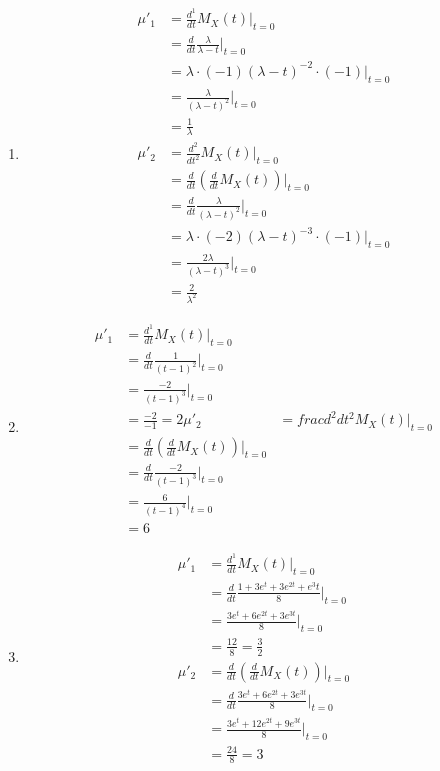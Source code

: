 \documentclass{article}
\begin{document}
\begin{enumerate}[label= zu \roman*)]
    \item 
        \begin{align*}
            \mu'_1 &= \frac{d^1}{dt} M_X(t) \bigg|_{t=0} \\
            &= \frac{d}{dt} \frac{\lambda}{\lambda - t} \bigg|_{t=0} \\  
            &= \lambda \cdot (-1)(\lambda - t)^{-2}\cdot(-1) \bigg|_{t=0} \\
            &= \frac{\lambda}{(\lambda - t)^2} \bigg|_{t=0} \\
            &= \frac{1}{\lambda} \\
            \mu'_2 &= \frac{d^2}{dt^2} M_X(t) \bigg|_{t=0} \\
            &= \frac{d}{dt} (\frac{d}{dt} M_X(t)) \bigg|_{t=0} \tag*{1. Ableitung von vorher} \\
            &= \frac{d}{dt} \frac{\lambda}{(\lambda - t)^2} \bigg|_{t=0} \\
            &= \lambda \cdot (-2) (\lambda- t)^{-3} \cdot (-1) \bigg|_{t=0}\\
            &= \frac{2\lambda}{(\lambda - t)^3} \bigg|_{t=0} \\
            &= \frac{2}{\lambda^2}
        \end{align*}
    \item 
        \begin{align*}
            \mu'_1 &= \frac{d^1}{dt} M_X(t) \bigg|_{t=0} \\
            &= \frac{d}{dt} \frac{1}{(t-1)^2} \bigg|_{t=0} \\
            &= \frac{-2}{(t-1)^3} \bigg|_{t=0} \\
            &= \frac{-2}{-1} = 2
            \mu'_2 &= frac{d^2}{dt^2} M_X(t) \bigg|_{t=0} \\
            &= \frac{d}{dt} (\frac{d}{dt} M_X(t)) \bigg|_{t=0} \tag*{1. Ableitung von vorher} \\
            &= \frac{d}{dt} \frac{-2}{(t-1)^3} \bigg|_{t=0} \\
            &= \frac{6}{(t-1)^4} \bigg|_{t=0} \\ 
            &= 6
        \end{align*}
    \item 
        \begin{align*}
            \mu'_1 &= \frac{d^1}{dt} M_X(t) \bigg|_{t=0} \\
            &= \frac{d}{dt} \frac{1 + 3 e^t + 3e^{2t}+ e^3t}{8} \bigg|_{t=0} \\
            &= \frac{3e^t + 6e^{2t}+ 3e^{3t}}{8} \bigg|_{t=0} \\
            &= \frac{12}{8} = \frac{3}{2} \\
            \mu'_2 &= \frac{d}{dt} (\frac{d}{dt} M_X(t)) \bigg|_{t=0} \\
            &= \frac{d}{dt} \frac{3e^t + 6e^{2t}+ 3e^{3t}}{8} \bigg|_{t=0} \\
            &= \frac{3e^t + 12e^{2t} + 9 e^{3t}}{8} \bigg|_{t=0} \\
            &= \frac{24}{8} = 3
        \end{align*}  
\end{enumerate}
\end{document}
